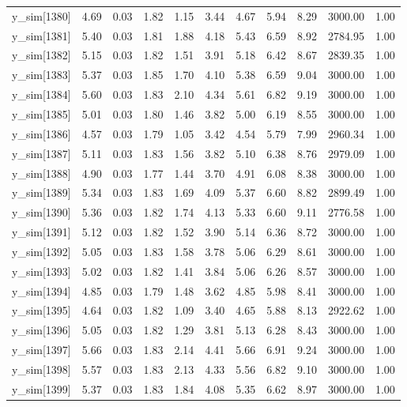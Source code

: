 \begin{table}[ht]
\begin{tabular}{rrrrrrrrrrr}
  y\_sim[1380] & 4.69 & 0.03 & 1.82 & 1.15 & 3.44 & 4.67 & 5.94 & 8.29 & 3000.00 & 1.00 \\ 
  y\_sim[1381] & 5.40 & 0.03 & 1.81 & 1.88 & 4.18 & 5.43 & 6.59 & 8.92 & 2784.95 & 1.00 \\ 
  y\_sim[1382] & 5.15 & 0.03 & 1.82 & 1.51 & 3.91 & 5.18 & 6.42 & 8.67 & 2839.35 & 1.00 \\ 
  y\_sim[1383] & 5.37 & 0.03 & 1.85 & 1.70 & 4.10 & 5.38 & 6.59 & 9.04 & 3000.00 & 1.00 \\ 
  y\_sim[1384] & 5.60 & 0.03 & 1.83 & 2.10 & 4.34 & 5.61 & 6.82 & 9.19 & 3000.00 & 1.00 \\ 
  y\_sim[1385] & 5.01 & 0.03 & 1.80 & 1.46 & 3.82 & 5.00 & 6.19 & 8.55 & 3000.00 & 1.00 \\ 
  y\_sim[1386] & 4.57 & 0.03 & 1.79 & 1.05 & 3.42 & 4.54 & 5.79 & 7.99 & 2960.34 & 1.00 \\ 
  y\_sim[1387] & 5.11 & 0.03 & 1.83 & 1.56 & 3.82 & 5.10 & 6.38 & 8.76 & 2979.09 & 1.00 \\ 
  y\_sim[1388] & 4.90 & 0.03 & 1.77 & 1.44 & 3.70 & 4.91 & 6.08 & 8.38 & 3000.00 & 1.00 \\ 
  y\_sim[1389] & 5.34 & 0.03 & 1.83 & 1.69 & 4.09 & 5.37 & 6.60 & 8.82 & 2899.49 & 1.00 \\ 
  y\_sim[1390] & 5.36 & 0.03 & 1.82 & 1.74 & 4.13 & 5.33 & 6.60 & 9.11 & 2776.58 & 1.00 \\ 
  y\_sim[1391] & 5.12 & 0.03 & 1.82 & 1.52 & 3.90 & 5.14 & 6.36 & 8.72 & 3000.00 & 1.00 \\ 
  y\_sim[1392] & 5.05 & 0.03 & 1.83 & 1.58 & 3.78 & 5.06 & 6.29 & 8.61 & 3000.00 & 1.00 \\ 
  y\_sim[1393] & 5.02 & 0.03 & 1.82 & 1.41 & 3.84 & 5.06 & 6.26 & 8.57 & 3000.00 & 1.00 \\ 
  y\_sim[1394] & 4.85 & 0.03 & 1.79 & 1.48 & 3.62 & 4.85 & 5.98 & 8.41 & 3000.00 & 1.00 \\ 
  y\_sim[1395] & 4.64 & 0.03 & 1.82 & 1.09 & 3.40 & 4.65 & 5.88 & 8.13 & 2922.62 & 1.00 \\ 
  y\_sim[1396] & 5.05 & 0.03 & 1.82 & 1.29 & 3.81 & 5.13 & 6.28 & 8.43 & 3000.00 & 1.00 \\ 
  y\_sim[1397] & 5.66 & 0.03 & 1.83 & 2.14 & 4.41 & 5.66 & 6.91 & 9.24 & 3000.00 & 1.00 \\ 
  y\_sim[1398] & 5.57 & 0.03 & 1.83 & 2.13 & 4.33 & 5.56 & 6.82 & 9.10 & 3000.00 & 1.00 \\ 
  y\_sim[1399] & 5.37 & 0.03 & 1.83 & 1.84 & 4.08 & 5.35 & 6.62 & 8.97 & 3000.00 & 1.00 \\ 

\end{tabular}
\end{table}

